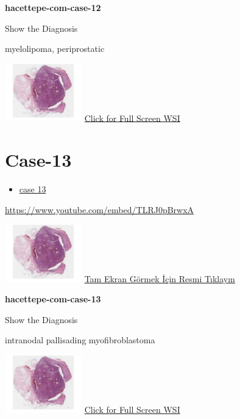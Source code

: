 \documentclass[
  letterpaper,
  paper=6in:9in,
  pagesize=pdftex,
  headinclude=on,
  footinclude=on,
  12pt]{scrbook}
\providecommand{\tightlist}{%
  \setlength{\itemsep}{0pt}\setlength{\parskip}{0pt}}\usepackage{longtable,booktabs,array}
\begin{document}
\textbf{hacettepe-com-case-12}

Show the Diagnosis

\hypertarget{answer12}{}
myelolipoma, periprostatic

\href{https://images.patolojiatlasi.com/hacettepe-com-case-1/HE.html}{\includegraphics[width=0.25\textwidth,height=\textheight]{./screenshots/hacettepe-com-case-1_screenshot.png}}
\href{https://images.patolojiatlasi.com/hacettepe-com-case-12/HE.html}{Click
for Full Screen WSI}

\hypertarget{sec-hacettepe-case-of-the-month-case-13}{%
\section{Case-13}\label{sec-hacettepe-case-of-the-month-case-13}}

\begin{itemize}
\tightlist
\item
  \href{https://www.youtube.com/watch?v=TLRJ0pBrwxA\&ab_channel=KemalKosemehmetoglu}{case
  13}
\end{itemize}

\url{https://www.youtube.com/embed/TLRJ0pBrwxA}

\href{https://images.patolojiatlasi.com/hacettepe-com-case-1/HE.html}{\includegraphics[width=0.25\textwidth,height=\textheight]{./screenshots/hacettepe-com-case-1_screenshot.png}}
\href{https://images.patolojiatlasi.com/hacettepe-com-case-13/HE.html}{Tam
Ekran Görmek İçin Resmi Tıklayın}

\textbf{hacettepe-com-case-13}

Show the Diagnosis

\hypertarget{answer13}{}
intranodal pallisading myofibroblastoma

\href{https://images.patolojiatlasi.com/hacettepe-com-case-1/HE.html}{\includegraphics[width=0.25\textwidth,height=\textheight]{./screenshots/hacettepe-com-case-1_screenshot.png}}
\href{https://images.patolojiatlasi.com/hacettepe-com-case-13/HE.html}{Click
for Full Screen WSI}
\end{document}
